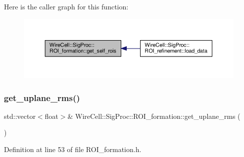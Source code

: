 Here is the caller graph for this function\+:
\nopagebreak
\begin{figure}[H]
\begin{center}
\leavevmode
\includegraphics[width=350pt]{class_wire_cell_1_1_sig_proc_1_1_r_o_i__formation_aa22dcb0af16abe3380c1d6c12c2d862d_icgraph}
\end{center}
\end{figure}
\mbox{\label{class_wire_cell_1_1_sig_proc_1_1_r_o_i__formation_a285fb34576a925bea63de0de7051e5bc}} 
\subsubsection{\texorpdfstring{get\+\_\+uplane\+\_\+rms()}{get\_uplane\_rms()}}
{\footnotesize\ttfamily std\+::vector$<$float$>$\& Wire\+Cell\+::\+Sig\+Proc\+::\+R\+O\+I\+\_\+formation\+::get\+\_\+uplane\+\_\+rms (\begin{DoxyParamCaption}{ }\end{DoxyParamCaption})\hspace{0.3cm}{\ttfamily [inline]}}



Definition at line 53 of file R\+O\+I\+\_\+formation.\+h.

